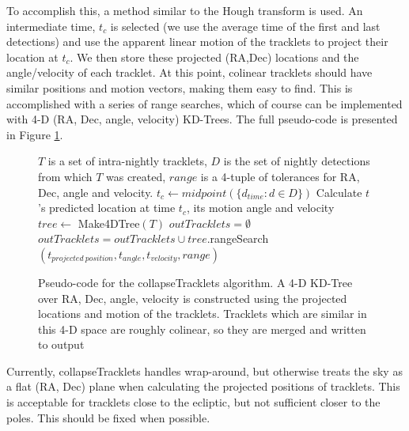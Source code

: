 To accomplish this, a method similar to the Hough transform is used.
An intermediate time, $t_c$ is selected (we use the average time of
the first and last detections) and use the apparent linear motion of
the tracklets to project their location at $t_c$.  We then store these
projected (RA,Dec) locations and the angle/velocity of each tracklet.
At this point, colinear tracklets should have similar positions and
motion vectors, making them easy to find.  This is accomplished with a
series of range searches, which of course can be implemented with 4-D
(RA, Dec, angle, velocity) KD-Trees.  The full pseudo-code is
presented in Figure \ref{collapseTrackletsAlgorithm}.

\begin{figure}[ht]
\begin{algorithmic}
  \REQUIRE $T$ is a set of intra-nightly tracklets, $D$ is the set of nightly detections from which $T$ was created, $range$ is a 4-tuple of tolerances for RA, Dec, angle and velocity.
  \STATE $t_c \gets midpoint(\{ d_{time} : d \in D \})$
    \STATE Calculate $t$'s predicted location at time $t_c$, its motion angle and velocity
  \ENDFOR
  \STATE {}
  \STATE $tree \gets$ Make4DTree$(T)$
  \STATE $outTracklets = \emptyset$
    \STATE {}
     \STATE $outTracklets = outTracklets \cup tree.$rangeSearch$(t_{projected\ position}, t_{angle}, t_{velocity}, range)$
  \ENDFOR
\end{algorithmic}

\caption{Pseudo-code for the collapseTracklets algorithm. A 4-D KD-Tree over RA, Dec, angle, velocity is constructed using the projected locations and motion of the tracklets.  Tracklets which are similar in this 4-D space are roughly colinear, so they are merged and written to output}

\label{collapseTrackletsAlgorithm}

\end{figure}

Currently, collapseTracklets handles wrap-around, but otherwise treats
the sky as a flat (RA, Dec) plane when calculating the projected
positions of tracklets.  This is acceptable for tracklets close to the
ecliptic, but not sufficient closer to the poles.  This should be
fixed when possible.

